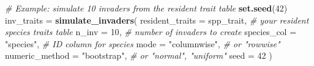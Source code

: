 \documentclass[
]{article}
\newenvironment{Shaded}{\begin{snugshade}}{\end{snugshade}}
\newcommand{\AttributeTok}[1]{\textcolor[rgb]{0.13,0.29,0.53}{#1}}
\newcommand{\CommentTok}[1]{\textcolor[rgb]{0.56,0.35,0.01}{\textit{#1}}}
\newcommand{\DecValTok}[1]{\textcolor[rgb]{0.00,0.00,0.81}{#1}}
\newcommand{\FunctionTok}[1]{\textcolor[rgb]{0.13,0.29,0.53}{\textbf{#1}}}
\newcommand{\NormalTok}[1]{#1}
\newcommand{\OtherTok}[1]{\textcolor[rgb]{0.56,0.35,0.01}{#1}}
\newcommand{\StringTok}[1]{\textcolor[rgb]{0.31,0.60,0.02}{#1}}
\begin{document}
\begin{Shaded}
\begin{Highlighting}[]
\CommentTok{\# Example: simulate 10 invaders from the resident trait table}
\FunctionTok{set.seed}\NormalTok{(}\DecValTok{42}\NormalTok{)}
\NormalTok{inv\_traits }\OtherTok{=} \FunctionTok{simulate\_invaders}\NormalTok{(}
  \AttributeTok{resident\_traits =}\NormalTok{ spp\_trait,  }\CommentTok{\# your resident species traits table}
  \AttributeTok{n\_inv           =} \DecValTok{10}\NormalTok{,         }\CommentTok{\# number of invaders to create}
  \AttributeTok{species\_col     =} \StringTok{"species"}\NormalTok{,  }\CommentTok{\# ID column for species}
  \AttributeTok{mode            =} \StringTok{"columnwise"}\NormalTok{,   }\CommentTok{\# or "rowwise"}
  \AttributeTok{numeric\_method  =} \StringTok{"bootstrap"}\NormalTok{,    }\CommentTok{\# or "normal", "uniform"}
  \AttributeTok{seed            =} \DecValTok{42}
\NormalTok{)}


\end{Highlighting}
\end{Shaded}
\end{document}
